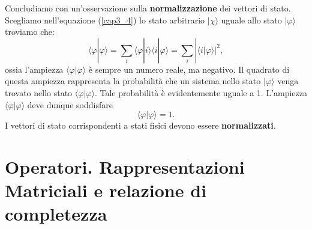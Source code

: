 Concludiamo con un'osservazione sulla \textbf{normalizzazione} dei vettori di stato. Scegliamo nell'equazione (\ref{cap3_4}) lo stato arbitrario $| \chi \rangle$ uguale allo stato $| \varphi \rangle$ troviamo che:
	\begin{equation}
		\langle \varphi | \varphi \rangle = \sum \limits_{i} \langle \varphi | i \rangle \langle i | \varphi \rangle = \sum \limits_{i} |\langle i | \varphi \rangle |^2 ,
	\end{equation}
ossia l'ampiezza $\langle \varphi| \varphi \rangle$ è sempre un numero reale, ma negativo. Il quadrato di questa ampiezza rappresenta la probabilità che un sistema nello stato $| \varphi \rangle$ venga trovato nello stato $\langle \varphi | \varphi \rangle $. Tale probabilità è evidentemente uguale a 1. L'ampiezza $\langle \varphi| \varphi \rangle$ deve dunque soddisfare
	\begin{equation}
		\langle \varphi| \varphi \rangle =1 .
	\end{equation}
I vettori di stato corrispondenti a stati fisici devono essere \textbf{normalizzati}.

\section[Operatori]{Operatori. Rappresentazioni Matriciali e relazione di completezza}

